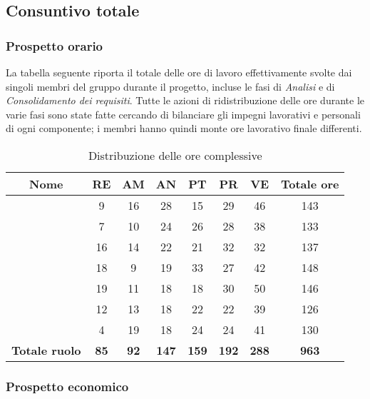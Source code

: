 \subsection{Consuntivo totale}

\subsubsection{Prospetto orario}
La tabella seguente riporta il totale delle ore di lavoro effettivamente svolte dai singoli membri del gruppo durante il progetto, incluse le fasi di \textit{Analisi} e di \textit{Consolidamento dei requisiti}. Tutte le azioni di ridistribuzione delle ore durante le varie fasi sono state fatte cercando di bilanciare gli impegni lavorativi e personali di ogni componente; i membri hanno quindi monte ore lavorativo finale differenti.

\begin{table}[H]
		\begin{center}
			\setlength{\aboverulesep}{0pt}
			\setlength{\belowrulesep}{0pt}
			\setlength{\extrarowheight}{.75ex}
			\begin{tabular}{ c c c c c c c c }
				\rowcolor{AzzurroGruppo!30} 
				\textbf{Nome} & \textbf{RE} & \textbf{AM} & \textbf{AN} & \textbf{PT} & \textbf{PR} & \textbf{VE} & \textbf{Totale ore}\\
				\toprule
				\Davide{}    & 9 & 16 & 28 & 15 & 29 & 46 & 143 \\
				\Giosue{}    & 7 & 10 & 24 & 26 & 28 & 38 & 133\\
				\Francesco{} & 16 & 14 & 22 & 21 & 32 & 32 & 137\\
				\Daniele{}   & 18 & 9 & 19 & 33 & 27 & 42 & 148\\
				\Lucrezia{}  & 19 & 11 & 18 & 18 & 30 & 50 & 146\\
				\Matteo{}   & 12 & 13 & 18 & 22 & 22 & 39 & 126\\
				\Tommaso{}   & 4 & 19 & 18 & 24 & 24 & 41 & 130\\
				\textbf{Totale ruolo} & \textbf{85} & \textbf{92} & \textbf{147} & \textbf{159} & \textbf{192} & \textbf{288} & \textbf{963} \\
				\bottomrule
			\end{tabular}
			\caption{Distribuzione delle ore complessive}
		\end{center}
	\end{table}
	
\subsubsection{Prospetto economico}

